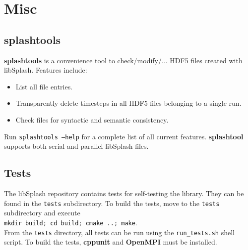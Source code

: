 \documentclass[a4paper,10pt,BCOR12mm]{report}
\newcommand{\command}[1]{\small \texttt{#1}}
\begin{document}

\chapter{Misc}


\section{splashtools}

\textbf{splashtools} is a convenience tool to check/modify/... HDF5 files created with libSplash.
Features include:
\begin{itemize}
	\item List all file entries.
	\item Transparently delete timesteps in all HDF5 files belonging to a single run.
	\item Check files for syntactic and semantic consistency.
\end{itemize}
Run \command{splashtools --help} for a complete list of all current features.
\textbf{splashtool} supports both serial and parallel libSplash files.


\section{Tests}

The libSplash repository contains tests for self-testing the library. They can be found in the
\command{tests} subdirectory. To build the tests, move to the \command{tests} subdirectory and execute\\
\command{mkdir build; cd build; cmake ..; make}.\\
From the \command{tests} directory, all tests can be run using the \command{run\_tests.sh} shell script.
To build the tests, \textbf{cppunit} and \textbf{OpenMPI} must be installed.

\end{document}

